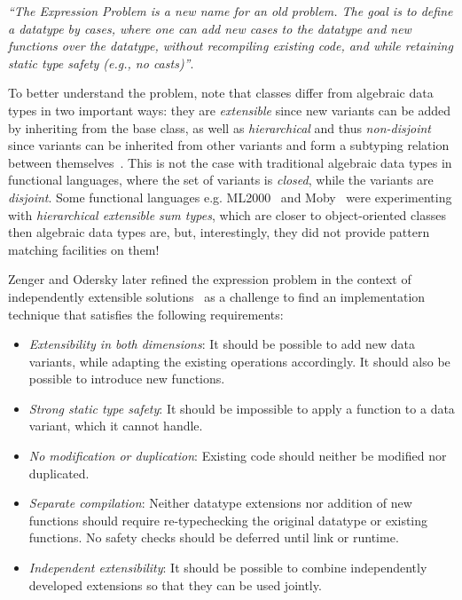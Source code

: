 \documentclass[preprint]{sigplanconf}
\begin{document}
\emph{``The Expression Problem is a new name for an old problem. The goal is
to define a datatype by cases, where one can add new cases to the
datatype and new functions over the datatype, without recompiling
existing code, and while retaining static type safety (e.g., no
casts)''}.

To better understand the problem, note that classes differ from algebraic data 
types in two important ways: they are \emph{extensible} since new variants can 
be added by inheriting from the base class, as well as \emph{hierarchical} and 
thus \emph{non-disjoint} since variants can be inherited from other variants and 
form a subtyping relation between themselves~\cite{Glew99}. This is not the case 
with traditional algebraic data types in functional languages, where the set of 
variants is \emph{closed}, while the variants are \emph{disjoint}. Some 
functional languages e.g. ML2000~\cite{ML2000} and Moby~\cite{Moby} were 
experimenting with \emph{hierarchical extensible sum types}, which are closer to 
object-oriented classes then algebraic data types are, but, interestingly, they 
did not provide pattern matching facilities on them!

Zenger and Odersky later refined the expression problem in the context of 
independently extensible solutions~\cite{fool12} as a challenge to find an 
implementation technique that satisfies the following requirements:

\begin{itemize}
\setlength{\itemsep}{0pt}
\setlength{\parskip}{0pt}
\item \emph{Extensibility in both dimensions}: It should be possible to add new 
      data variants, while adapting the existing operations accordingly. It 
      should also be possible to introduce new functions. 
\item \emph{Strong static type safety}: It should be impossible to apply a 
      function to a data variant, which it cannot handle. 
\item \emph{No modification or duplication}: Existing code should neither be 
      modified nor duplicated.
\item \emph{Separate compilation}: Neither datatype extensions nor addition of 
      new functions should require re-typechecking the original datatype or 
      existing functions. No safety checks should be deferred until link or 
      runtime.
\item \emph{Independent extensibility}: It should be possible to combine 
      independently developed extensions so that they can be used jointly.
\end{itemize}
\end{document}
